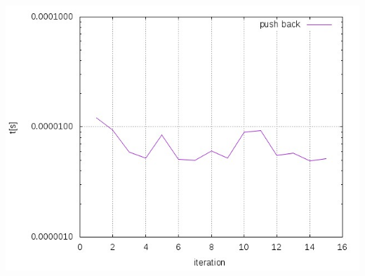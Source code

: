 \documentclass{beamer}
\begin{document}
\begin{frame}
	\includegraphics[width=\textwidth,height=0.8\textheight,keepaspectratio]
					{move_with_noexcept.jpeg}
\end{frame}
\end{document}
